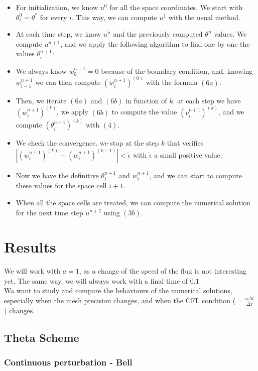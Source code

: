 \documentclass[12pt]{article}
\begin{document}
\begin{itemize}
    \item For initialization, we know $u^0$ for all the space coordinates. We start with $\theta_i^0 = \theta^*$ for every $i$. This way, we can compute $u^1$ with the usual method.
    \item At each time step, we know $u^n$ and the previously computed $\theta^n$ values.
We compute $u^{n+1}$, and we apply the following algorithm to find one by one the values $\theta_i^{n+1}$:
    \item We always know $w_0^{n+1} = 0$ because of the boundary condition, and, knowing $w_{i-1}^{n+1}$ we can then compute $(w_i^{n+1})^{(0)}$ with the formula $(6a)$.
    \item Then, we iterate $(6a)$ and $(6b)$ in function of $k$: at each step we have $(w_i^{n+1})^{(k)}$, we apply $(6b)$ to compute the value $(v_i^{n+1})^{(k)}$, and we compute $(\theta_i^{n+1})^{(k)}$ with $(4)$.
    \item We check the convergence. we stop at the step $k$ that verifies $|(w_i^{n+1})^{(k)} - (w_i^{n+1})^{(k-1)}| < \tilde{\epsilon}$ with $\tilde{\epsilon}$ a small positive value. %
    \item Now we have the definitive $\theta_i^{n+1}$ and $w_i^{n+1}$, and we can start to compute these values for the space cell $i+1$.
    \item When all the space cells are treated, we can compute the numerical solution for the next time step $u^{n+2}$ using $(3b)$.
\end{itemize}


\section{Results}
We will work with $a = 1$, as a change of the speed of the flux is not interesting yet. The same way, we will always work with a final time of $0.1$\\
Wa want to study  and compare the behaviours of the numerical solutions, especially when the mesh precision changes, and when the CFL condition ($=\frac{a\Delta t}{\Delta x}$) changes.

\subsection*{Theta Scheme}

\subsubsection*{Continuous perturbation - Bell}
\end{document}
